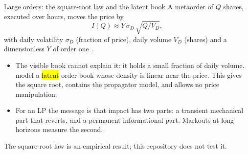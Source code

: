 \begin{frame}{Large orders: the square-root law and the latent book}
  \small
  A metaorder of $Q$ shares, executed over hours, moves the price by
  \[ I(Q) \approx Y\,\sigma_D\,\sqrt{Q/V_D}, \]
  with daily volatility $\sigma_D$ (fraction of price), daily volume $V_D$ (shares) and a dimensionless $Y$ of order one \citep{toth2011anomalous}.
  \begin{itemize}
    \item The visible book cannot explain it: it holds a small fraction of daily volume. \citet{donier2015fully} model a \hl{latent} order book whose density is linear near the price. This gives the square root, contains the propagator model, and allows no price manipulation.
    \item For an LP the message is that impact has two parts: a transient mechanical part that reverts, and a permanent informational part. Markouts at long horizons measure the second.
  \end{itemize}
  \vspace{0.3em}
  The square-root law is an empirical result; this repository does not test it.
\end{frame}
